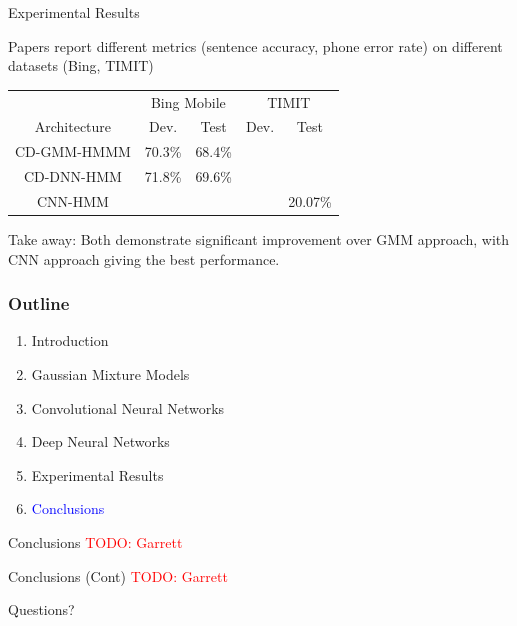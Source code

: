 \documentclass[notes]{beamer}
\newcommand{\TODO}[1]{\textcolor{red}{TODO: #1}}
\begin{document}
\begin{frame}{Experimental Results}

\begin{table}[H]
	\begin{center}
		Papers report different metrics (sentence accuracy, phone error rate) on different datasets (Bing, TIMIT) 
	\end{center}
	
	\vfill

	\centering
	\begin{tabular}{c|c|c|c|c}
		& \multicolumn{2}{c|}{Bing Mobile} & \multicolumn{2}{c}{TIMIT}\\
		Architecture & Dev. & Test  & Dev. & Test \\
		\hline
		CD-GMM-HMMM & 70.3\% & 68.4\% & & \\
		CD-DNN-HMM & 71.8\% & 69.6\% & & \\
		\hline
		CNN-HMM  & & &  & 20.07\%
	\end{tabular}

	\vfill

	\begin{center}
		Take away: Both demonstrate significant improvement over GMM approach, with CNN approach giving the best performance.
	\end{center}
\end{table}

\end{frame}

\begin{frame}
	\frametitle{Outline}
	
	\begin{enumerate}
		\item Introduction
		\item Gaussian Mixture Models
		\item Convolutional Neural Networks
		\item Deep Neural Networks
		\item Experimental Results
		\item \textcolor{blue}{Conclusions}
	\end{enumerate}
\end{frame}

\begin{frame}{Conclusions}
	\TODO{Garrett}
\end{frame}

\begin{frame}{Conclusions (Cont)}
	\TODO{Garrett}
\end{frame}

\begin{frame}
	\begin{center}
		Questions?
	\end{center}
\end{frame}
\end{document}
